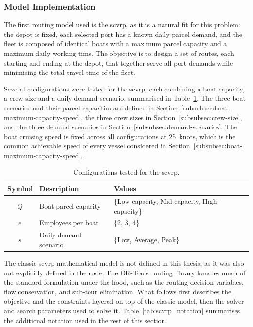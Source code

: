 \documentclass[12pt]{article}
\begin{document}
\subsubsection{Model Implementation}
\label{subsubsec:scvrp-implementation}

The first routing model used is the \ac{scvrp}, as it is a natural fit for this problem: the depot is fixed, each selected port has a known daily parcel demand, and the fleet is composed of identical boats with a maximum parcel capacity and a maximum daily working time. The objective is to design a set of routes, each starting and ending at the depot, that together serve all port demands while minimising the total travel time of the fleet.

Several configurations were tested for the \ac{scvrp}, each combining a boat capacity, a crew size and a daily demand scenario, summarised in Table~\ref{tab:cvrp_configs}. The three boat scenarios and their parcel capacities are defined in Section~\ref{subsubsec:boat-maximum-capacity-speed}, the three crew sizes in Section~\ref{subsubsec:crew-size}, and the three demand scenarios in Section~\ref{subsubsec:demand-scenarios}. The boat cruising speed is fixed across all configurations at \qty{25}{knots}, which is the common achievable speed of every vessel considered in Section~\ref{subsubsec:boat-maximum-capacity-speed}.

\begin{table}[htbp]
  \centering
  \caption{Configurations tested for the \ac{scvrp}.}
  \label{tab:cvrp_configs}

  \begin{tabularx}{\textwidth}{c >{\raggedright\arraybackslash}X l}
    \toprule
    \textbf{Symbol} & \textbf{Description}  & \textbf{Values}                               \\
    \midrule
    \(Q\)           & Boat parcel capacity  & \{Low-capacity, Mid-capacity, High-capacity\} \\
    \(e\)           & Employees per boat    & \{2, 3, 4\}                                   \\
    \(s\)           & Daily demand scenario & \{Low, Average, Peak\}                        \\
    \bottomrule
  \end{tabularx}
\end{table}

The classic \ac{scvrp} mathematical model is not defined in this thesis, as it was also not explicitly defined in the code. The OR-Tools routing library \parencite{ortools} handles much of the standard formulation under the hood, such as the routing decision variables, flow conservation, and sub-tour elimination. What follows first describes the objective and the constraints layered on top of the classic model, then the solver and search parameters used to solve it. Table~\ref{tab:scvrp_notation} summarises the additional notation used in the rest of this section.
\end{document}
